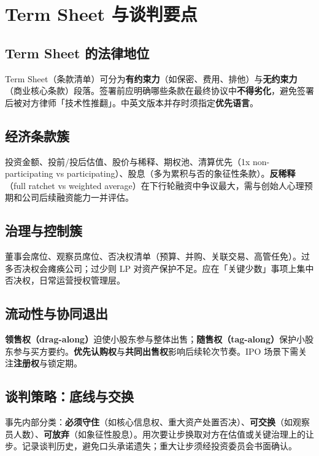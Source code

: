 \chapter{Term Sheet 与谈判要点}

\section{Term Sheet 的法律地位}

Term Sheet（条款清单）可分为\textbf{有约束力}（如保密、费用、排他）与\textbf{无约束力}（商业核心条款）段落。签署前应明确哪些条款在最终协议中\textbf{不得劣化}，避免签署后被对方律师「技术性推翻」。中英文版本并存时须指定\textbf{优先语言}。

\section{经济条款簇}

投资金额、投前/投后估值、股价与稀释、期权池、清算优先（1x non-participating vs participating）、股息（多为累积与否的象征性条款）。\textbf{反稀释}（full ratchet vs weighted average）在下行轮融资中争议最大，需与创始人心理预期和公司后续融资能力一并评估。

\section{治理与控制簇}

董事会席位、观察员席位、否决权清单（预算、并购、关联交易、高管任免）。过多否决权会瘫痪公司；过少则 LP 对资产保护不足。应在「关键少数」事项上集中否决权，日常运营授权管理层。

\section{流动性与协同退出}

\textbf{领售权（drag-along）}迫使小股东参与整体出售；\textbf{随售权（tag-along）}保护小股东参与买方要约。\textbf{优先认购权}与\textbf{共同出售权}影响后续轮次节奏。IPO 场景下需关注\textbf{注册权}与锁定期。

\section{谈判策略：底线与交换}

事先内部分类：\textbf{必须守住}（如核心信息权、重大资产处置否决）、\textbf{可交换}（如观察员人数）、\textbf{可放弃}（如象征性股息）。用次要让步换取对方在估值或关键治理上的让步。记录谈判历史，避免口头承诺遗失；重大让步须经投资委员会书面确认。
